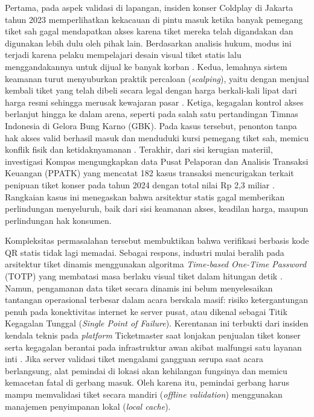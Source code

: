 Pertama, pada aspek validasi di lapangan, insiden konser Coldplay di Jakarta tahun 2023 memperlihatkan kekacauan di pintu masuk ketika banyak pemegang tiket sah gagal mendapatkan akses karena tiket mereka telah digandakan dan digunakan lebih dulu oleh pihak lain. Berdasarkan analisis hukum, modus ini terjadi karena pelaku mempelajari desain visual tiket statis lalu menggandakannya untuk dijual ke banyak korban \cite{berma2023analisis}. Kedua, lemahnya sistem keamanan turut menyuburkan praktik percaloan (\textit{scalping}), yaitu dengan menjual kembali tiket yang telah dibeli secara legal dengan harga berkali-kali lipat dari harga resmi sehingga merusak kewajaran pasar \cite{Pamela2023}. Ketiga, kegagalan kontrol akses berlanjut hingga ke dalam arena, seperti pada salah satu pertandingan Timnas Indonesia di Gelora Bung Karno (GBK). Pada kasus tersebut, penonton tanpa hak akses valid berhasil masuk dan menduduki kursi pemegang tiket sah, memicu konflik fisik dan ketidaknyamanan \cite{Kurniawan2024}. Terakhir, dari sisi kerugian materiil, investigasi Kompas mengungkapkan data Pusat Pelaporan dan Analisis Transaksi Keuangan (PPATK) yang mencatat 182 kasus transaksi mencurigakan terkait penipuan tiket konser pada tahun 2024 dengan total nilai Rp 2,3 miliar \cite{diveranta2025jejak}. Rangkaian kasus ini menegaskan bahwa arsitektur statis gagal memberikan perlindungan menyeluruh, baik dari sisi keamanan akses, keadilan harga, maupun perlindungan hak konsumen.

Kompleksitas permasalahan tersebut membuktikan bahwa verifikasi berbasis kode QR statis tidak lagi memadai. Sebagai respons, industri mulai beralih pada arsitektur tiket dinamis menggunakan algoritma \textit{Time-based One-Time Password} (TOTP) yang membatasi masa berlaku visual tiket dalam hitungan detik \cite{sung2015security}. Namun, pengamanan data tiket secara dinamis ini belum menyelesaikan tantangan operasional terbesar dalam acara berskala masif: risiko ketergantungan penuh pada konektivitas internet ke server pusat, atau dikenal sebagai Titik Kegagalan Tunggal (\textit{Single Point of Failure}). Kerentanan ini terbukti dari insiden kendala teknis pada \textit{platform} Ticketmaster saat lonjakan penjualan tiket konser \cite{cockroach2023taylor} serta kegagalan berantai pada infrastruktur awan akibat malfungsi satu layanan inti \cite{aws2017summary}. Jika server validasi tiket mengalami gangguan serupa saat acara berlangsung, alat pemindai di lokasi akan kehilangan fungsinya dan memicu kemacetan fatal di gerbang masuk. Oleh karena itu, pemindai gerbang harus mampu memvalidasi tiket secara mandiri (\textit{offline validation}) menggunakan manajemen penyimpanan lokal (\textit{local cache}).

